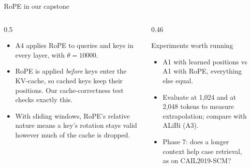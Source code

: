 \documentclass[aspectratio=169,11pt]{beamer}
\begin{document}
\begin{frame}{RoPE in our capstone}
  \begin{columns}[T]
    \begin{column}{0.5\textwidth}
      \small
      \begin{itemize}
        \item A4 applies RoPE to queries and keys in every layer, with $\theta=10000$.
        \item RoPE is applied \emph{before} keys enter the KV-cache, so cached keys keep their positions. Our cache-correctness test checks exactly this.
        \item With sliding windows, RoPE's relative nature means a key's rotation stays valid however much of the cache is dropped.
      \end{itemize}
    \end{column}
    \begin{column}{0.46\textwidth}
      \begin{block}{Experiments worth running}
        \small
        \begin{itemize}
          \item A1 with learned positions vs A1 with RoPE, everything else equal.
          \item Evaluate at 1,024 and at 2,048 tokens to measure extrapolation; compare with ALiBi (A3).
          \item Phase 7: does a longer context help case retrieval, as on CAIL2019-SCM?
        \end{itemize}
      \end{block}
    \end{column}
  \end{columns}
\end{frame}
\end{document}
